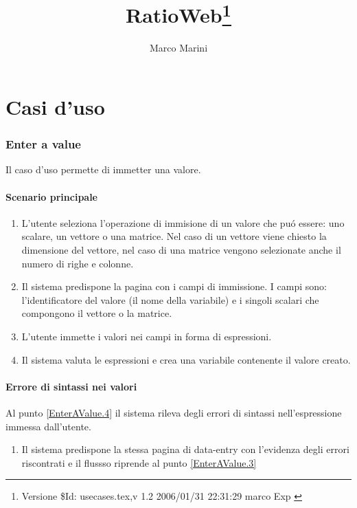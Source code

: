 \documentclass{article}
\begin{document}
  \title{RatioWeb\thanks{Versione \$Id: usecases.tex,v 1.2 2006/01/31 22:31:29 marco Exp $ $}}
  \author{Marco Marini}
  \maketitle
  \part{Casi d'uso}
  \section{Enter a value}
  Il caso d'uso permette di immetter una valore.
  
  \subsection{Scenario principale}
  \begin{enumerate}
    \item
      \label{EnterAValue.1}
      L'utente seleziona l'operazione di immisione di un valore che pu\'o
      essere: uno scalare, un vettore o una matrice.
      Nel caso di un vettore viene chiesto la dimensione del vettore, nel caso
      di una matrice vengono selezionate anche il numero di righe e colonne.
    \item
      \label{EnterAValue.2}
      Il sistema predispone la pagina con i campi di immissione.
      I campi sono: l'identificatore del valore (il nome della variabile) e i
      singoli scalari che compongono il vettore o la matrice.
    \item
      \label{EnterAValue.3}
      L'utente immette i valori nei campi in forma di espressioni.
    \item
      \label{EnterAValue.4}
      Il sistema valuta le espressioni e crea una variabile contenente il
      valore creato.
  \end{enumerate}
  
  \subsection{Errore di sintassi nei valori}
  Al punto \ref{EnterAValue.4} il sistema rileva degli errori di sintassi
  nell'espressione immessa dall'utente.
  \begin{enumerate}
    \item
      Il sistema predispone la stessa pagina di data-entry con l'evidenza
      degli errori riscontrati e il flussso riprende al punto
      \ref{EnterAValue.3}
  \end{enumerate}
  
\end{document}
